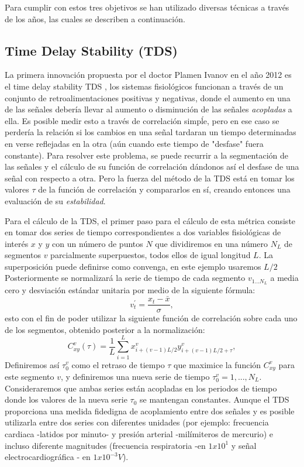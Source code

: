 \documentclass[twoside,twocolumn]{article}
\begin{document}
\twocolumn
Para cumplir con estos tres objetivos se han utilizado diversas técnicas a través de los años, las cuales se describen a continuación.
\subsection{Time Delay Stability (TDS)}
La primera innovación propuesta por el doctor Plamen Ivanov en el año 2012 es el time delay stability {TDS} \cite{bashan2012network}, los sistemas fisiológicos funcionan a través de un conjunto de retroalimentaciones positivas y negativas, donde el aumento en una de las señales debería llevar al aumento o disminución de las señales \textit{acopladas} a ella. Es posible medir esto a través de correlación simpĺe, pero en ese caso se perdería la relación si los cambios en una señal tardaran un tiempo determinadas en verse reflejadas en la otra (aún cuando este tiempo de "desfase" fuera constante).
Para resolver este problema, se puede recurrir a la segmentación de las señales y el cálculo de su función de correlación dándonos así el desfase de una señal con respecto a otra. Pero la fuerza del método de la TDS está en tomar los valores $\tau$ de la función de correlación y compararlos en sí, creando entonces una evaluación de su \textit{estabilidad}.

Para el cálculo de la TDS, el primer paso para el cálculo de esta métrica consiste en tomar dos series de tiempo correspondientes a dos variables fisiológicas de interés $x$ y $y$ con un número de puntos $N$ que dividiremos en una número $N_L$ de segmentos $v$ parcialmente superpuestos, todos ellos de igual longitud $L$.
La superposición puede definirse como convenga, en este ejemplo usaremos $L/2$
Posteriormente se normalizará la serie de tiempo de cada segmento $v_{1...N_L}$ a media cero y desviación estándar unitaria por medio de la siguiente fórmula:
\begin{equation}
  v^\prime_t = \frac{x_t-\bar{x}}{\sigma} ,
\end{equation}
esto con el fin de poder utilizar la siguiente función de correlación sobre cada uno de los segmentos, obtenido posterior a la normalización:
\begin{equation}
  C^v_{xy}(\tau)=\frac{1}{L}\sum^L_{i=1}x^v_{i+(v-1)L/2}y^v_{i+(v-1)L/2+\tau} ,
\end{equation}
Definiremos así $\tau^v_0$ como el retraso de tiempo $\tau$ que maximice la función $C^v_{xy}$ para este segmento $v$, y definiremos una nueva serie de tiempo ${\tau^v_0}=1,...,N_L$.
Consideraremos que ambas series están acopladas en los periodos de tiempo donde los valores de la nueva serie $\tau_0$ se mantengan constantes.
Aunque el TDS proporciona una medida fidedigna de acoplamiento entre dos señales y es posible utilizarla entre dos series con diferentes unidades (por ejemplo: frecuencia cardiaca -latidos por minuto- y presión arterial -milímiteros de mercurio) e incluso diferente magnitudes (frecuencia respiratoria -en $1x10^1$ y señal electrocardiográfica - en $1x10^{-3}V$). 
\end{document}
